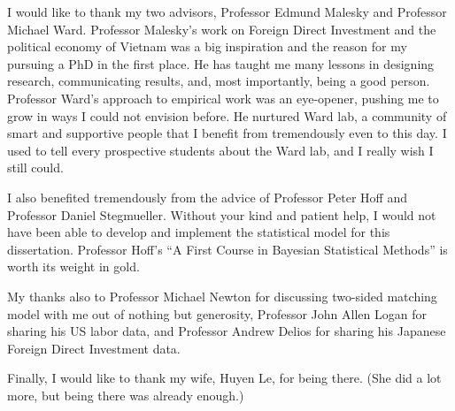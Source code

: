\acknowledgements

I would like to thank my two advisors, Professor Edmund Malesky and Professor Michael Ward. Professor Malesky's work on Foreign Direct Investment and the political economy of Vietnam was a big inspiration and the reason for my pursuing a PhD in the first place. He has taught me many lessons in designing research, communicating results, and, most importantly, being a good person. Professor Ward's approach to empirical work was an eye-opener, pushing me to grow in ways I could not envision before. He nurtured Ward lab, a community of smart and supportive people that I benefit from tremendously even to this day. I used to tell every prospective students about the Ward lab, and I really wish I still could.  

I also benefited tremendously from the advice of Professor Peter Hoff and Professor Daniel Stegmueller. Without your kind and patient help, I would not have been able to develop and implement the statistical model for this dissertation. Professor Hoff's ``A First Course in Bayesian Statistical Methods'' is worth its weight in gold.

My thanks also to Professor Michael Newton for discussing two-sided matching model with me out of nothing but generosity, Professor John Allen Logan for sharing his US labor data, and Professor Andrew Delios for sharing his Japanese Foreign Direct Investment data.

Finally, I would like to thank my wife, Huyen Le, for being there. (She did a lot more, but being there was already enough.)